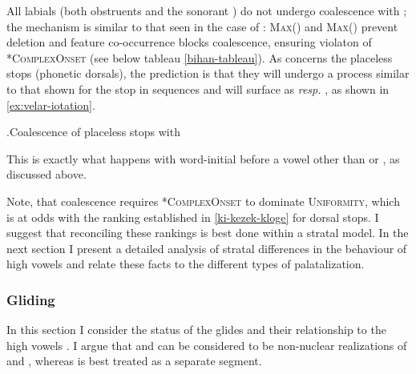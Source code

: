 All labials (both obstruents and the sonorant \ipa{[m]}) do not undergo coalescence with \ipa{[j]}; the mechanism is similar to that seen in the case of \ipa{[r]}: \textsc{Max}() and \textsc{Max}() prevent deletion and feature co-occurrence blocks coalescence, ensuring violaton of *\textsc{Complex\hspace{0pt}Onset} (see below tableau \ref{bihan-tableau}). As concerns the placeless stops (phonetic dorsals), the prediction is that they will undergo a process similar to that shown for the stop in \ipa{[st]} sequences and will surface as \ipa{[ʧ]} \emph{resp.\@} \ipa{[dʒ]}, as shown in \ref{ex:velar-iotation}.

\ex.\label{ex:velar-iotation}Coalescence of placeless stops with \ipa{[j]}\\

This is exactly what happens with word-initial \ipa{[ʧ]} before a vowel other than \ipa{[i]} or \ipa{[y]}, as discussed above.

Note, that coalescence requires *\textsc{ComplexOnset} to dominate \textsc{Uniformity}, which is at odds with the ranking established in \ref{ki-kezek-kloge} for dorsal stops. I suggest that reconciling these rankings is best done within a stratal model. In the next section I present a detailed analysis of stratal differences in the behaviour of high vowels and relate these facts to the different types of palatalization.

\subsubsection{Gliding}
\label{sec:gliding}

In this section I consider the status of the glides \ipa{[w~j~ɥ]} and their relationship to the high vowels \ipa{[u~i~y]}. I argue that \ipa{[w]} and \ipa{[j]} can be considered to be non-nuclear realizations of \ipa{[u]} and \ipa{[i]}, whereas \ipa{[ɥ]} is best treated as a separate segment.

